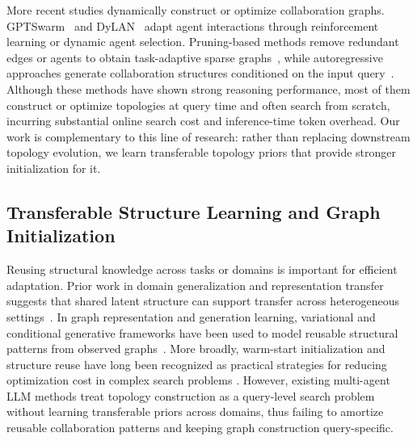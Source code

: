 \documentclass[lettersize,journal]{IEEEtran}
\theoremstyle{plain}
\begin{document}
More recent studies dynamically construct or optimize collaboration graphs. GPTSwarm~\cite{DBLP:conf/icml/ZhugeWKFKS24} and DyLAN~\cite{liu2024} adapt agent interactions through reinforcement learning or dynamic agent selection. Pruning-based methods remove redundant edges or agents to obtain task-adaptive sparse graphs~\cite{DBLP:conf/iclr/ZhangYLYWWCY025,DBLP:conf/acl/WangW00Z0025}, while autoregressive approaches generate collaboration structures conditioned on the input query~\cite{DBLP:conf/icml/ZhangYSWYF00C25,DBLP:conf/aaai/LiLWZP26}. Although these methods have shown strong reasoning performance, most of them construct or optimize topologies at query time and often search from scratch, incurring substantial online search cost and inference-time token overhead. Our work is complementary to this line of research: rather than replacing downstream topology evolution, we learn transferable topology priors that provide stronger initialization for it.

\subsection{Transferable Structure Learning and Graph Initialization}
Reusing structural knowledge across tasks or domains is important for efficient adaptation. Prior work in domain generalization and representation transfer suggests that shared latent structure can support transfer across heterogeneous settings~\cite{dua-etal-2023-adapt,DBLP:journals/pami/LiYDZS24,dey-lal-2025-transferability}. In graph representation and generation learning, variational and conditional generative frameworks have been used to model reusable structural patterns from observed graphs~\cite{DBLP:journals/corr/KipfW16a,cao-etal-2025-graphinsight}. More broadly, warm-start initialization and structure reuse have long been recognized as practical strategies for reducing optimization cost in complex search problems \cite{DBLP:conf/wacv/GoswamiSWS23,DBLP:conf/icml/AngellM24}.
However, existing multi-agent LLM methods treat topology construction as a query-level search problem without learning transferable priors across domains, thus failing to amortize reusable collaboration patterns and keeping graph construction query-specific.
\end{document}
